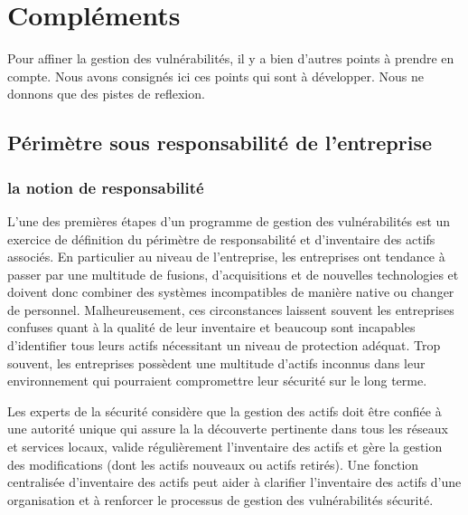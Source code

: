 
\section{Compléments}

Pour affiner la gestion des vulnérabilités, il y a bien d'autres points à prendre en compte. Nous avons consignés ici ces points qui sont à développer. Nous ne donnons que des pistes de reflexion.
\subsection{Périmètre sous responsabilité de l’entreprise}

\subsubsection{la notion de responsabilité}

L'une des premières étapes d'un programme de gestion des vulnérabilités est un exercice de définition du périmètre de responsabilité et d'inventaire des actifs associés. En particulier au niveau de l'entreprise, les entreprises ont tendance à passer par une multitude de fusions, d'acquisitions et de nouvelles technologies et doivent donc combiner des systèmes incompatibles de manière native ou changer de personnel. Malheureusement, ces circonstances laissent souvent les entreprises confuses quant à la qualité de leur inventaire et beaucoup sont incapables d'identifier tous leurs actifs nécessitant un niveau de protection adéquat. Trop souvent, les entreprises possèdent une multitude d'actifs inconnus dans leur environnement qui pourraient compromettre leur sécurité sur le long terme.

Les experts de la sécurité considère que la gestion des actifs doit être confiée à une autorité unique qui assure la la découverte pertinente dans tous les réseaux et services locaux, valide régulièrement l’inventaire des actifs et gère la gestion des modifications (dont les actifs nouveaux ou actifs retirés). Une fonction centralisée d’inventaire des actifs peut aider à clarifier l’inventaire des actifs d’une organisation et à renforcer le processus de gestion des vulnérabilités sécurité.



